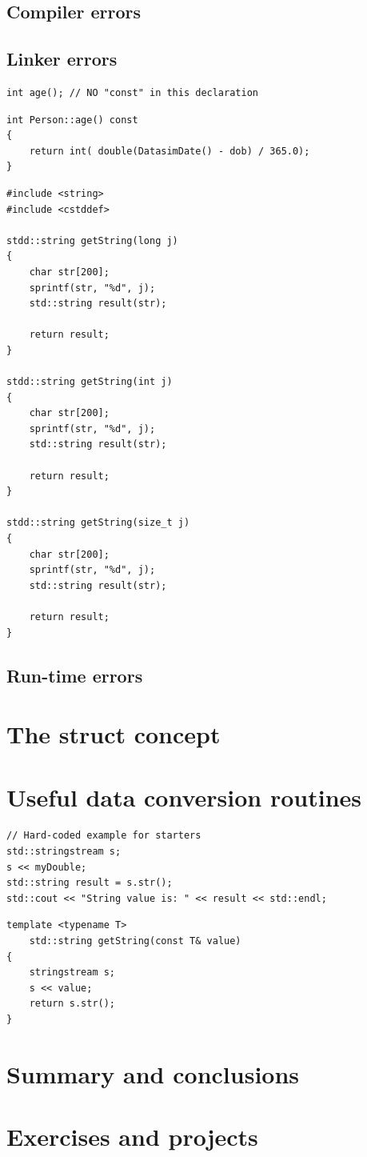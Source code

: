 \subsection{Compiler errors}

\subsection{Linker errors}

\begin{lstlisting}
int age(); // NO "const" in this declaration
\end{lstlisting}

\begin{lstlisting}
int Person::age() const
{
	return int( double(DatasimDate() - dob) / 365.0);
}
\end{lstlisting}



\begin{lstlisting}
#include <string>
#include <cstddef>

stdd::string getString(long j)
{
	char str[200];
	sprintf(str, "%d", j);
	std::string result(str);
	
	return result;
}

stdd::string getString(int j)
{
	char str[200];
	sprintf(str, "%d", j);
	std::string result(str);

	return result;
}

stdd::string getString(size_t j)
{
	char str[200];
	sprintf(str, "%d", j);
	std::string result(str);

	return result;
}
\end{lstlisting}

\subsection{Run-time errors}

\section{The struct concept}

\section{Useful data conversion routines}

\begin{lstlisting}
// Hard-coded example for starters
std::stringstream s;
s << myDouble;
std::string result = s.str();
std::cout << "String value is: " << result << std::endl;
\end{lstlisting}

\begin{lstlisting}
template <typename T>
	std::string getString(const T& value)
{
	stringstream s;
	s << value;
	return s.str();
}
\end{lstlisting}

\section{Summary and conclusions}

\section{Exercises and projects}